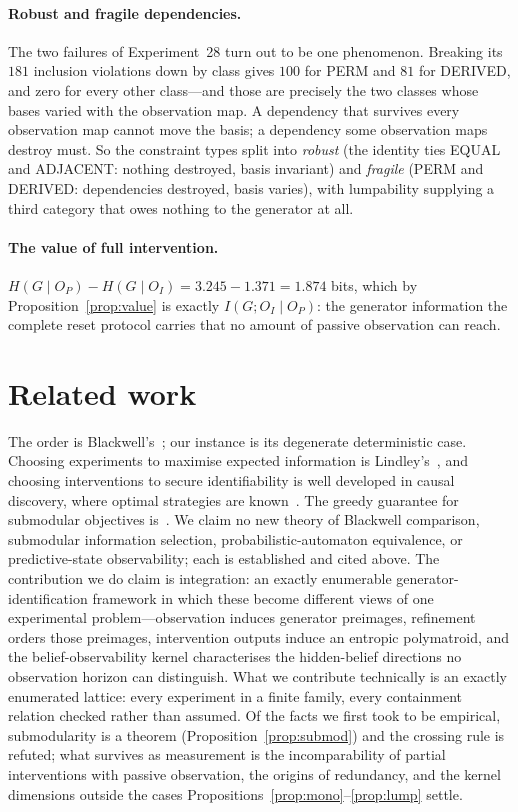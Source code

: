 \documentclass[11pt]{article}
\begin{document}
\paragraph{Robust and fragile dependencies.}
The two failures of Experiment~28 turn out to be one phenomenon. Breaking its $181$
inclusion violations down by class gives $100$ for PERM and $81$ for DERIVED, and zero for
every other class---and those are precisely the two classes whose bases varied with the
observation map. A dependency that survives every observation map cannot move the basis; a
dependency some observation maps destroy must. So the constraint types split into
\emph{robust} (the identity ties EQUAL and ADJACENT: nothing destroyed, basis invariant)
and \emph{fragile} (PERM and DERIVED: dependencies destroyed, basis varies), with
lumpability supplying a third category that owes nothing to the generator at all.

\paragraph{The value of full intervention.}
$H(G \mid O_P) - H(G \mid O_I) = 3.245 - 1.371 = 1.874$ bits, which by
Proposition~\ref{prop:value} is exactly $I(G; O_I \mid O_P)$: the generator information the
complete reset protocol carries that no amount of passive observation can reach.

\section{Related work}

The order is Blackwell's~\cite{blackwell1953}; our instance is its degenerate deterministic
case. Choosing experiments to maximise expected information is Lindley's~\cite{lindley1956},
and choosing interventions to secure identifiability is well developed in causal discovery,
where optimal strategies are known~\cite{hauser2014}. The greedy guarantee for submodular
objectives is~\cite{nemhauser1978}. We claim no new theory of Blackwell comparison, submodular information selection,
probabilistic-automaton equivalence, or predictive-state observability; each is established
and cited above. The contribution we do claim is integration: an exactly enumerable
generator-identification framework in which these become different views of one
experimental problem---observation induces generator preimages, refinement orders those
preimages, intervention outputs induce an entropic polymatroid, and the
belief-observability kernel characterises the hidden-belief directions no observation
horizon can distinguish. What we contribute technically is an
exactly enumerated lattice: every experiment in a finite family, every containment relation
checked rather than assumed. Of the facts we first took to be empirical, submodularity is a
theorem (Proposition~\ref{prop:submod}) and the crossing rule is refuted; what survives as
measurement is the incomparability of partial interventions with passive observation, the
origins of redundancy, and the kernel dimensions outside the cases
Propositions~\ref{prop:mono}--\ref{prop:lump} settle.
\end{document}
